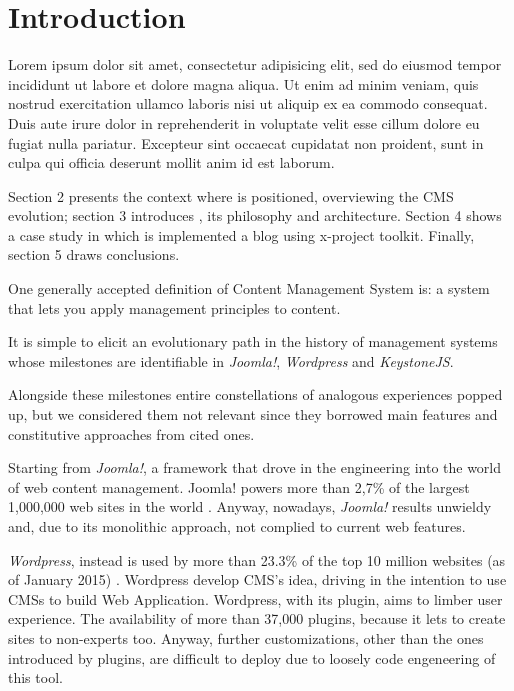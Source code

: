\section{Introduction}\label{sec:introduction}








Lorem ipsum dolor sit amet, consectetur adipisicing elit, sed do eiusmod
tempor incididunt ut labore et dolore magna aliqua. Ut enim ad minim veniam,
quis nostrud exercitation ullamco laboris nisi ut aliquip ex ea commodo
consequat. Duis aute irure dolor in reprehenderit in voluptate velit esse
cillum dolore eu fugiat nulla pariatur. Excepteur sint occaecat cupidatat non
proident, sunt in culpa qui officia deserunt mollit anim id est laborum.


Section 2 presents the context where  is positioned, overviewing the CMS evolution; section 3 introduces , its philosophy and architecture. Section 4 shows a case study in which is implemented a blog using x-project toolkit. Finally, section 5 draws conclusions.


One generally accepted definition of Content Management System is: a system that lets you apply management principles to content.

It is simple to elicit an evolutionary path in the history of management systems whose milestones are identifiable in \emph{Joomla!}, \emph{Wordpress} and \emph{KeystoneJS}.

Alongside these milestones entire constellations of analogous experiences popped up, but we considered them not relevant since they borrowed main features and constitutive approaches from cited ones. 

Starting from \emph{Joomla!}, a framework that drove in the engineering into the world of web content management. Joomla! powers more than 2,7\% of the largest 1,000,000 web sites in the world \cite{usage-cms}. Anyway, nowadays, \emph{Joomla!} results unwieldy and, due to its monolithic approach, not complied to current web features.

\emph{Wordpress}, instead is used by more than 23.3\% of the top 10 million websites (as of January 2015) \cite{usage-cms}. Wordpress develop CMS’s idea, driving in the intention to use CMSs to build Web Application. Wordpress, with its plugin, aims to limber user experience. The availability of more than 37,000 plugins, because it lets to create sites to non-experts too.
Anyway, further customizations, other than the ones introduced by plugins, are difficult to deploy due to loosely code engeneering of this tool.

